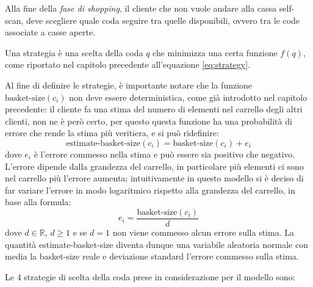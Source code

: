 Alla fine della \textit{fase di shopping}, il cliente che non vuole andare alla cassa self-scan, deve scegliere quale coda seguire tra quelle disponibili, ovvero tra le code associate a casse aperte. 

Una strategia è una scelta della coda $q$ che minimizza una certa funzione $f(q)$, come riportato nel capitolo precedente all'equazione \ref{eq:strategy}. 

Al fine di definire le strategie, è importante notare che la funzione $\text{basket-size}(c_i)$ non deve essere deterministica, come già introdotto nel capitolo precedente: il cliente fa una stima del numero di elementi nel carrello degli altri clienti, non ne è però certo, per questo questa funzione ha una probabilità di errore che rende la stima più veritiera, e si può ridefinire:
\begin{equation}\label{eq:estimate-basket-size}
\text{estimate-basket-size}(c_i) = \text{basket-size}(c_i) + e_i
\end{equation}
dove $e_i$ è l'errore commesso nella stima e può essere sia positivo che negativo. L'errore dipende dalla grandezza del carrello, in particolare più elementi ci sono nel carrello più l'errore aumenta; intuitivamente in questo modello si è deciso di far variare l'errore in modo logaritmico rispetto alla grandezza del carrello, in base alla formula:
\begin{equation}\label{eq:error-basket-size}
e_i = \frac{\text{basket-size}(c_i)}{d}
\end{equation}
dove $d \in \mathbb{R}$, $d \ge 1$ e se $d = 1$ non viene commesso alcun errore sulla stima. 
La quantità estimate-basket-size diventa dunque una variabile aleatoria normale con media la basket-size reale e deviazione standard l'errore commesso sulla stima.

Le 4 strategie di scelta della coda prese in considerazione per il modello sono:

